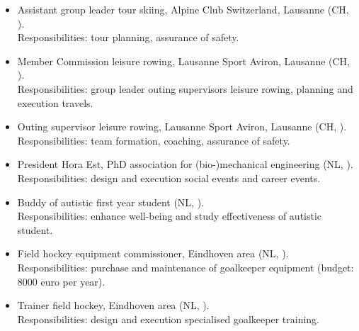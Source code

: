 \documentclass[
    bibsize = normalsize,
    bibpackage = none,
    paragraphshape = display,
    paragraphafter = none,
]{goose-article}
\begin{document}
\begin{itemize}
    \itemsep0em
    \item Assistant group leader tour skiing, Alpine Club Switzerland, Lausanne (CH, \MyDateCAS).
    \\
    Responsibilities: tour planning, assurance of safety.
    \item Member Commission leisure rowing, Lausanne Sport Aviron, Lausanne (CH, \MyDateLSArandonnee).
    \\
    Responsibilities: group leader outing supervisors leisure rowing, planning and execution travels.
    \item Outing supervisor leisure rowing, Lausanne Sport Aviron, Lausanne (CH, \MyDateLSAencadrant).
    \\
    Responsibilities: team formation, coaching, assurance of safety.
    \item President Hora Est, PhD association for (bio-)mechanical engineering (NL, \MyDateHoraEst).
    \\
    Responsibilities: design and execution social events and career events.
    \item Buddy of autistic first year student (NL, \MyDateBuddy).
    \\
    Responsibilities: enhance well-being and study effectiveness of autistic student.
    \item Field hockey equipment commissioner, Eindhoven area (NL, \MyDateHockeyEquipment).
    \\
    Responsibilities: purchase and maintenance of goalkeeper equipment (budget: 8000 euro per year).
    \item Trainer field hockey, Eindhoven area (NL, \MyDateHockeyTrainer).
    \\
    Responsibilities: design and execution specialised goalkeeper training.
\end{itemize}


\end{document}
